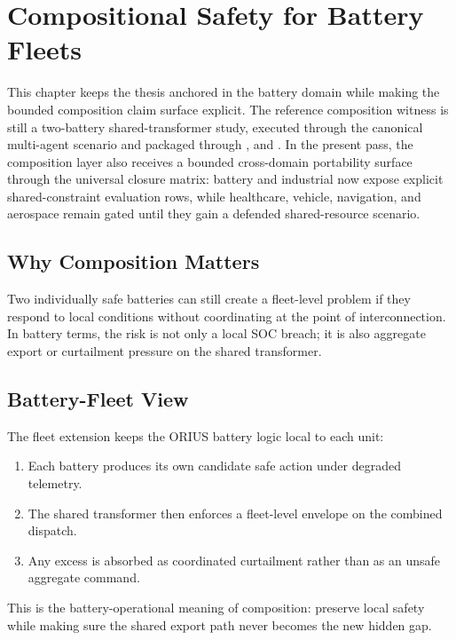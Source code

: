 \chapter{Compositional Safety for Battery Fleets}
\label{ch:compositional-safety-fleets}

This chapter keeps the thesis anchored in the battery domain while making the
bounded composition claim surface explicit.  The reference composition witness is still a
two-battery shared-transformer study, executed through the canonical
multi-agent scenario and packaged through
,
 and
.  In the present
pass, the composition layer also receives a bounded cross-domain portability surface through
the universal closure matrix: battery and industrial now expose explicit
shared-constraint evaluation rows, while healthcare, vehicle, navigation, and
aerospace remain gated until they gain a defended shared-resource scenario.

\section{Why Composition Matters}

Two individually safe batteries can still create a fleet-level problem if
they respond to local conditions without coordinating at the point of
interconnection.  In battery terms, the risk is not only a local SOC breach;
it is also aggregate export or curtailment pressure on the shared transformer.

\section{Battery-Fleet View}

The fleet extension keeps the ORIUS battery logic local to each unit:

\begin{enumerate}
  \item Each battery produces its own candidate safe action under degraded
    telemetry.
  \item The shared transformer then enforces a fleet-level envelope on the
    combined dispatch.
  \item Any excess is absorbed as coordinated curtailment rather than as an
    unsafe aggregate command.
\end{enumerate}

This is the battery-operational meaning of composition: preserve local safety
while making sure the shared export path never becomes the new hidden gap.

